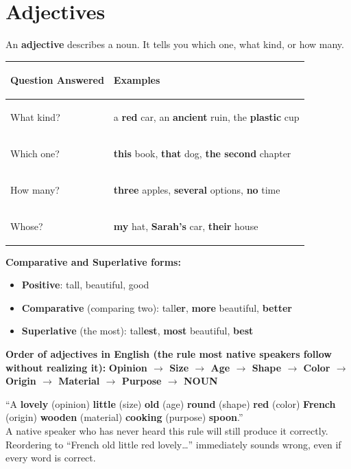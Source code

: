 \documentclass[11pt, letterpaper]{article}
\newcommand{\example}[1]{%
  \begin{tcolorbox}[colback=exbg, colframe=exborder,
    title={\bfseries Example}, arc=3pt, boxrule=1pt]
  #1
  \end{tcolorbox}%
}
\begin{document}
\section*{Adjectives}

An \textbf{adjective} describes a noun. It tells you which one, what kind, or how many.

\noindent
{\renewcommand{\arraystretch}{1.5}
\begin{tabularx}{\textwidth}{>{\bfseries\raggedright\arraybackslash}p{3cm}
                              >{\raggedright\arraybackslash}X}
\toprule
\rowcolor{tableheader}
\textbf{Question Answered} & \textbf{Examples} \\
\midrule
\rowcolor{rowA}  What kind?    & a \textbf{red} car, an \textbf{ancient} ruin, the \textbf{plastic} cup \\
\rowcolor{rowB}  Which one?    & \textbf{this} book, \textbf{that} dog, \textbf{the second} chapter \\
\rowcolor{rowA}  How many?     & \textbf{three} apples, \textbf{several} options, \textbf{no} time \\
\rowcolor{rowB}  Whose?        & \textbf{my} hat, \textbf{Sarah's} car, \textbf{their} house \\
\bottomrule
\end{tabularx}}

\textbf{Comparative and Superlative forms:}
\begin{itemize}[noitemsep]
  \item \textbf{Positive}: tall, beautiful, good
  \item \textbf{Comparative} (comparing two): tall\textbf{er}, \textbf{more} beautiful, \textbf{better}
  \item \textbf{Superlative} (the most): tall\textbf{est}, \textbf{most} beautiful, \textbf{best}
\end{itemize}

\textbf{Order of adjectives in English (the rule most native speakers follow without realizing it):}
\textbf{Opinion $\to$ Size $\to$ Age $\to$ Shape $\to$ Color $\to$ Origin $\to$ Material $\to$ Purpose $\to$ NOUN}

\example{
``A \textbf{lovely} (opinion) \textbf{little} (size) \textbf{old} (age) \textbf{round} (shape)
\textbf{red} (color) \textbf{French} (origin) \textbf{wooden} (material) \textbf{cooking} (purpose)
\textbf{spoon}.''\\[4pt]
A native speaker who has never heard this rule will still produce it correctly. Reordering
to ``French old little red lovely\ldots'' immediately sounds wrong, even if every word is correct.
}
\end{document}

